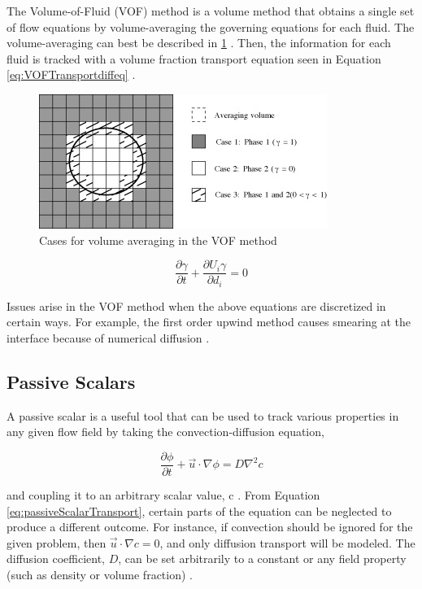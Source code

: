 \documentclass{UCF_ETD}
\begin{document}
The Volume-of-Fluid (VOF) method is a volume method that obtains a single set of flow equations by volume-averaging the governing equations for each fluid. The volume-averaging can best be described in \ref{fig:volumeAveraging} \cite{GOPALA2008204}. Then, the information for each fluid is tracked with a volume fraction transport equation seen in Equation \ref{eq:VOFTransportdiffeq} \cite{HIRT1981201}.

\begin{figure}
    \centering
    \includegraphics{Figures/volumeAveraging.jpg}
    \caption{Cases for volume averaging in the VOF method \cite{GOPALA2008204}}
    \label{fig:volumeAveraging}
\end{figure}

\begin{equation}
    \frac{\partial\gamma}{\partial t}+\frac{\partial U_i\gamma}{\partial d_i}=0
    \label{eq:VOFTransportdiffeq}
\end{equation}

Issues arise in the VOF method when the above equations are discretized in certain ways. For example, the first order upwind method causes smearing at the interface because of numerical diffusion \cite{GOPALA2008204}.

\subsection{Passive Scalars}
A passive scalar is a useful tool that can be used to track various properties in any given flow field by taking the convection-diffusion equation,

\begin{equation}
    \frac{\partial \phi}{\partial t} + \vec{u} \cdot \nabla \phi=D \nabla^{2} c
    \label{eq:passiveScalarTransport}
\end{equation}

\noindent and coupling it to an arbitrary scalar value, c \cite{Kirby_2010}. From Equation \ref{eq:passiveScalarTransport}, certain parts of the equation can be neglected to produce a different outcome. For instance, if convection should be ignored for the given problem, then $\vec{u} \cdot \nabla c =0$, and only diffusion transport will be modeled. The diffusion coefficient, $D$, can be set arbitrarily to a constant or any field property (such as density or volume fraction) \cite{Kirby_2010, starccm}.
\end{document}
